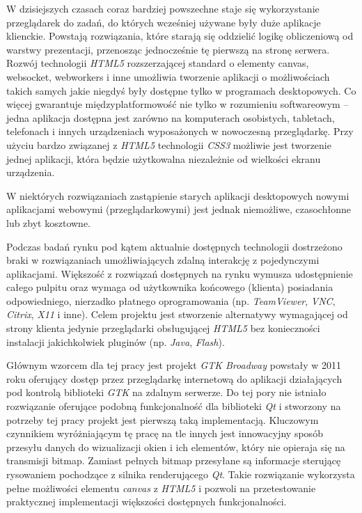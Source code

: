 
W dzisiejszych czasach coraz bardziej powszechne staje się wykorzystanie przeglądarek do zadań, do których wcześniej używane były duże aplikacje klienckie. Powstają rozwiązania, które starają się oddzielić logikę obliczeniową od warstwy prezentacji, przenosząc jednocześnie tę pierwszą na stronę serwera. Rozwój technologii \emph{HTML5} rozszerzającej standard o elementy canvas, websocket, webworkers i inne umożliwia tworzenie aplikacji o możliwościach takich samych jakie niegdyś były dostępne tylko w programach desktopowych. Co więcej gwarantuje międzyplatformowość nie tylko w rozumieniu softwareowym -- jedna aplikacja dostępna jest zarówno na komputerach osobistych, tabletach, telefonach i innych urządzeniach wyposażonych w nowoczesną przeglądarkę. Przy użyciu bardzo związanej z \emph{HTML5} technologii \emph{CSS3} możliwie jest tworzenie jednej aplikacji, która będzie użytkowalna niezależnie od wielkości ekranu urządzenia.\cite{responsive}

W niektórych rozwiązaniach zastąpienie starych aplikacji desktopowych nowymi aplikacjami webowymi (przeglądarkowymi) jest jednak niemożliwe, czasochłonne lub zbyt kosztowne.

Podczas badań rynku pod kątem aktualnie dostępnych technologii dostrzeżono braki w rozwiązaniach umożliwiających zdalną interakcję z pojedynczymi aplikacjami. Większość z rozwiązań dostępnych na rynku wymusza udostępnienie całego pulpitu oraz wymaga od użytkownika końcowego (klienta) posiadania odpowiedniego, nierzadko płatnego oprogramowania (np. \emph{TeamViewer}, \emph{VNC}, \emph{Citrix}, \emph{X11} i inne). Celem projektu jest stworzenie alternatywy wymagającej od strony klienta jedynie przeglądarki obsługującej \emph{HTML5} bez konieczności instalacji jakichkolwiek pluginów (np. \emph{Java}, \emph{Flash}).

Głównym wzorcem dla tej pracy jest projekt \emph{GTK Broadway} powstały w 2011 roku oferujący dostęp przez przeglądarkę internetową do aplikacji działających pod kontrolą biblioteki \emph{GTK} na zdalnym serwerze. Do tej pory nie istniało rozwiązanie oferujące podobną funkcjonalność dla biblioteki \emph{Qt} i stworzony na potrzeby tej pracy projekt jest pierwszą taką implementacją. Kluczowym czynnikiem wyróżniającym tę pracę na tle innych jest innowacyjny sposób przesyłu danych do wizualizacji okien i ich elementów, który nie opieraja się na transmisji bitmap. Zamiast pełnych bitmap przesyłane są informacje sterującę rysowaniem pochodzące z silnika renderującego \emph{Qt}.
Takie rozwiązanie wykorzysta pełne możliwości elementu \emph{canvas} z \emph{HTML5} i pozwoli na przetestowanie praktycznej implementacji większości dostępnych funkcjonalności.

